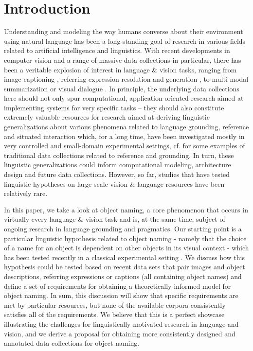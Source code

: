 \documentclass[runningheads]{llncs}
\begin{document}
\section{Introduction}

Understanding and modeling the way humans converse about their environment using natural language has been a long-standing goal of research in various fields related to artificial intelligence and linguistics.
With recent  developments in computer vision and a range of massive data collections in particular, there has been a veritable explosion of interest in language \& vision tasks, ranging from image captioning \cite{fangetal:2015,devlin:imcaqui,chen2015mind,vinyals:show,Bernardietal:automatic}, referring expression resolution and generation \cite{Kazemzadeh2014,mao15,Yu2016,schlazar:acl16}, to multi-modal summarization or visual dialogue \cite{das2017visual,vries2017guesswhat}.
In principle, the underlying data collections here should not only spur computational, application-oriented research aimed at implementing systems for very specific tasks -- they should also constitute extremely valuable resources for research aimed at deriving linguistic generalizations about various phenomena related to language grounding, reference and situated interaction which, for a long time, have been investigated mostly in very controlled and small-domain experimental settings, cf. \cite{anderson1991hcrc,fernangen:sigd07,krahmer:2012,takenobu2012rex,zarriess2016pentoref} for some examples of traditional data collections related to reference and grounding.  
In turn, these linguistic generalizations could inform computational modeling, architecture design and future data collections.
However, so far, studies that have tested linguistic hypotheses on large-scale vision \& language resources have been relatively rare. 


In this paper, we take a look at object naming, a core phenomenon that occurs in virtually every language \& vision task and is, at the same time, subject of ongoing research in language grounding and pragmatics. 
Our starting point is a particular linguistic hypothesis related to object naming - namely that the choice of a name for an object is dependent on other objects in its visual context - which has been tested recently in a classical experimental setting \cite{graf2016animal}. 
We discuss how this hypothesis could be tested based on recent data sets that pair images and object descriptions, referring expressions or captions (all containing object names) and define a set of requirements for obtaining a theoretically informed model for object naming.
In sum, this discussion will show that specific requirements are met by particular resources, but none of the available corpora consistently satisfies all of the requirements.
We believe that this is a perfect showcase illustrating the challenges for linguistically motivated research in language and vision, and we derive a proposal for obtaining more consistently designed and annotated data collections for object naming.
\end{document}
